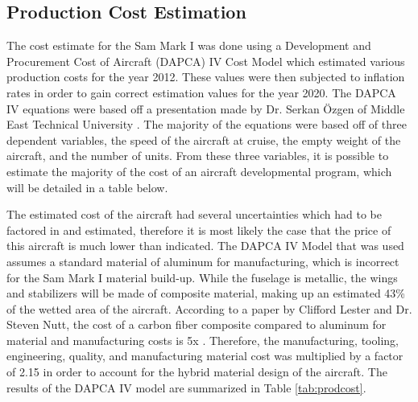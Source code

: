 \subsection{Production Cost Estimation}

The cost estimate for the Sam Mark I was done using a Development and Procurement Cost of Aircraft (DAPCA) IV Cost Model which estimated various production costs for the year 2012. These values were then subjected to inflation rates in order to gain correct estimation values for the year 2020. The DAPCA IV equations were based off a presentation made by Dr. Serkan Özgen of Middle East Technical University \cite{dapca}. The majority of the equations were based off of three dependent variables, the speed of the aircraft at cruise, the empty weight of the aircraft, and the number of units. From these three variables, it is possible to estimate the majority of the cost of an aircraft developmental program, which will be detailed in a table below.

The estimated cost of the aircraft had several uncertainties which had to be factored in and estimated, therefore it is most likely the case that the price of this aircraft is much lower than indicated. The DAPCA IV Model that was used assumes a standard material of aluminum for manufacturing, which is incorrect for the Sam Mark I material build-up. While the fuselage is metallic, the wings and stabilizers will be made of composite material, making up an estimated 43\% of the wetted area of the aircraft. According to a paper by Clifford Lester and Dr. Steven Nutt, the cost of a carbon fiber composite compared to aluminum for material and manufacturing costs is 5x \cite{compositecost}. Therefore, the manufacturing, tooling, engineering, quality, and manufacturing material cost was multiplied by a factor of 2.15 in order to account for the hybrid material design of the aircraft. The results of the DAPCA IV model are summarized in Table \ref{tab:prodcost}.

